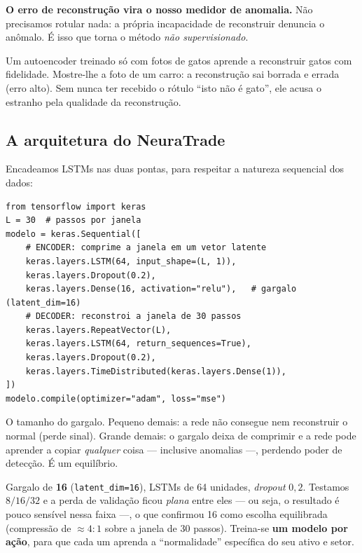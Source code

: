 \textbf{O erro de reconstrução vira o nosso medidor de anomalia.} Não precisamos
rotular nada: a própria incapacidade de reconstruir denuncia o anômalo. É isso
que torna o método \emph{não supervisionado}.

\begin{exemplo}
Um autoencoder treinado só com fotos de gatos aprende a reconstruir gatos com
fidelidade. Mostre-lhe a foto de um carro: a reconstrução sai borrada e errada
(erro alto). Sem nunca ter recebido o rótulo ``isto não é gato'', ele acusa o
estranho pela qualidade da reconstrução.
\end{exemplo}

\subsection{A arquitetura do NeuraTrade}
Encadeamos LSTMs nas duas pontas, para respeitar a natureza sequencial dos dados:

\begin{lstlisting}[caption={LSTM-Autoencoder (esqueleto da arquitetura do projeto).}]
from tensorflow import keras
L = 30  # passos por janela
modelo = keras.Sequential([
    # ENCODER: comprime a janela em um vetor latente
    keras.layers.LSTM(64, input_shape=(L, 1)),
    keras.layers.Dropout(0.2),
    keras.layers.Dense(16, activation="relu"),   # gargalo (latent_dim=16)
    # DECODER: reconstroi a janela de 30 passos
    keras.layers.RepeatVector(L),
    keras.layers.LSTM(64, return_sequences=True),
    keras.layers.Dropout(0.2),
    keras.layers.TimeDistributed(keras.layers.Dense(1)),
])
modelo.compile(optimizer="adam", loss="mse")
\end{lstlisting}

\begin{definicao}
O tamanho do gargalo. Pequeno demais: a rede não consegue nem reconstruir o
normal (perde sinal). Grande demais: o gargalo deixa de comprimir e a rede pode
aprender a copiar \emph{qualquer} coisa --- inclusive anomalias ---, perdendo
poder de detecção. É um equilíbrio.
\end{definicao}

\begin{naprat}
Gargalo de \textbf{16} (\texttt{latent\_dim=16}), LSTMs de 64 unidades,
\emph{dropout} $0{,}2$. Testamos $8/16/32$ e a perda de validação ficou
\emph{plana} entre eles --- ou seja, o resultado é pouco sensível nessa faixa ---,
o que confirmou 16 como escolha equilibrada (compressão de $\approx 4{:}1$ sobre
a janela de 30 passos). Treina-se \textbf{um modelo por ação}, para que cada um
aprenda a ``normalidade'' específica do seu ativo e setor.
\end{naprat}
